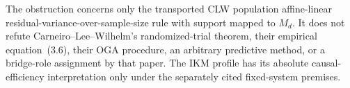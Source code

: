 The obstruction concerns only the transported CLW population affine-linear residual-variance-over-sample-size rule with support mapped to \(M_d\). It does not refute Carneiro--Lee--Wilhelm's randomized-trial theorem, their empirical equation~(3.6), their OGA procedure, an arbitrary predictive method, or a bridge-role assignment by that paper. The IKM profile has its absolute causal-efficiency interpretation only under the separately cited fixed-system premises.